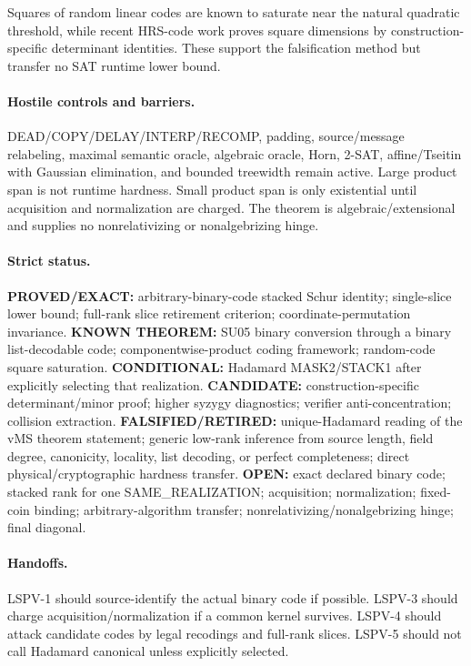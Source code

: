 \documentclass[11pt]{article}
\begin{document}
Squares of random linear codes are known to saturate near the natural quadratic threshold, while recent HRS-code work proves square dimensions by construction-specific determinant identities. These support the falsification method but transfer no SAT runtime lower bound.

\paragraph{Hostile controls and barriers.}
DEAD/COPY/DELAY/INTERP/RECOMP, padding, source/message relabeling, maximal semantic oracle, algebraic oracle, Horn, 2-SAT, affine/Tseitin with Gaussian elimination, and bounded treewidth remain active. Large product span is not runtime hardness. Small product span is only existential until acquisition and normalization are charged. The theorem is algebraic/extensional and supplies no nonrelativizing or nonalgebrizing hinge.

\paragraph{Strict status.}
\textbf{PROVED/EXACT:} arbitrary-binary-code stacked Schur identity; single-slice lower bound; full-rank slice retirement criterion; coordinate-permutation invariance.
\textbf{KNOWN THEOREM:} SU05 binary conversion through a binary list-decodable code; componentwise-product coding framework; random-code square saturation.
\textbf{CONDITIONAL:} Hadamard MASK2/STACK1 after explicitly selecting that realization.
\textbf{CANDIDATE:} construction-specific determinant/minor proof; higher syzygy diagnostics; verifier anti-concentration; collision extraction.
\textbf{FALSIFIED/RETIRED:} unique-Hadamard reading of the vMS theorem statement; generic low-rank inference from source length, field degree, canonicity, locality, list decoding, or perfect completeness; direct physical/cryptographic hardness transfer.
\textbf{OPEN:} exact declared binary code; stacked rank for one SAME\_REALIZATION; acquisition; normalization; fixed-coin binding; arbitrary-algorithm transfer; nonrelativizing/nonalgebrizing hinge; final diagonal.

\paragraph{Handoffs.}
LSPV-1 should source-identify the actual binary code if possible. LSPV-3 should charge acquisition/normalization if a common kernel survives. LSPV-4 should attack candidate codes by legal recodings and full-rank slices. LSPV-5 should not call Hadamard canonical unless explicitly selected.
\end{document}
